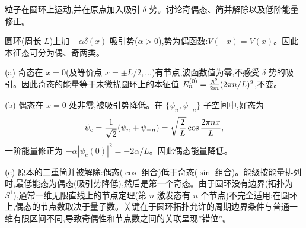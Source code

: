 \begin{question}
粒子在圆环上运动,并在原点加入吸引 $\delta$ 势。讨论奇偶态、简并解除以及低阶能量修正。
\begin{solution}
圆环(周长 $L$)上加 $-\alpha\delta(x)$ 吸引势($\alpha>0$),势为偶函数:$V(-x)=V(x)$。因此本征态可分为偶、奇两类。

(a) 奇态在 $x=0$(及等价点 $x=\pm L/2,\dots$)有节点,波函数值为零,不感受 $\delta$ 势的吸引。因此奇态的能量等于未微扰圆环上的本征值 $E_n^{(0)} = {\hbar^2\over2m}(2\pi n/L)^2$,不变。

(b) 偶态在 $x=0$ 处非零,被吸引势降低。在 $\{\psi_n,\psi_{-n}\}$ 子空间中,好态为
\[
\psi_c = {1\over\sqrt2}(\psi_n+\psi_{-n}) = \sqrt{2\over L}\cos{2\pi nx\over L},
\]
一阶能量修正为 $-\alpha|\psi_c(0)|^2 = -2\alpha/L$。因此偶态能量降低。

(c) 原本的二重简并被解除:偶态($\cos$ 组合)低于奇态($\sin$ 组合)。能级按能量排列时,最低能态为偶态(吸引势降低),然后是第一个奇态。由于圆环没有边界(拓扑为 $S^1$),通常一维无限直线上的节点定理(第 $n$ 激发态有 $n$ 个节点)不完全适用:在圆环上,偶态的节点数取决于量子数。关键在于圆环拓扑允许的周期边界条件与普通一维有限区间不同,导致奇偶性和节点数之间的关联呈现”错位”。
\end{solution}
\end{question}

